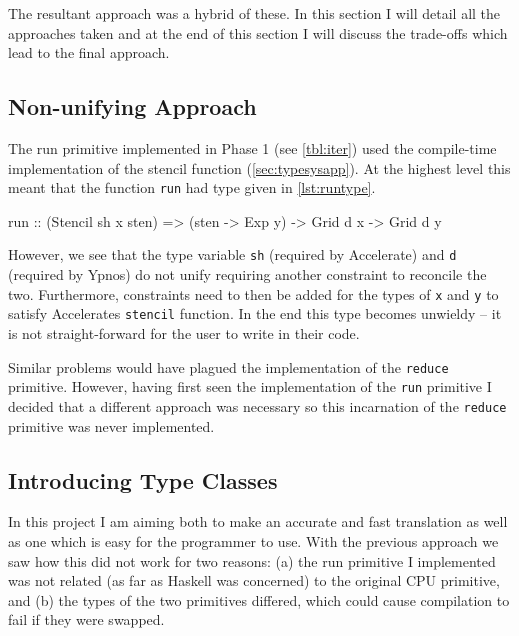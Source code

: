 \documentclass[
    12pt,
    a4paper,
    twoside,
    openright,
    ]{scrbook}
\begin{document}
The resultant approach was a hybrid of these. In this section I will detail all
the approaches taken and at the end of this section I will discuss the
trade-offs which lead to the final approach.

\subsection{Non-unifying Approach}
\label{sec:non-unify-appr}

The run primitive implemented in Phase 1 (see \autoref{tbl:iter}) used the
compile-time implementation of the stencil function
(\autoref{sec:typesysapp}). At the highest level this meant that the function
\texttt{run} had type given in \autoref{lst:runtype}.

\begin{hlisting}[label={lst:runtype}, caption=The type of run required by Accelerate.]
run :: (Stencil sh x sten) => (sten -> Exp y) -> Grid d x -> Grid d y
\end{hlisting}

However, we see that the type variable \texttt{sh} (required by Accelerate) and
\texttt{d} (required by Ypnos) do not unify requiring another constraint to
reconcile the two. Furthermore, constraints need to then be added for the types
of \texttt{x} and \texttt{y} to satisfy Accelerates \texttt{stencil}
function. In the end this type becomes unwieldy -- it is not straight-forward
for the user to write in their code.

Similar problems would have plagued the implementation of the \texttt{reduce}
primitive. However, having first seen the implementation of the \texttt{run}
primitive I decided that a different approach was necessary so this incarnation
of the \texttt{reduce} primitive was never implemented.

\subsection{Introducing Type Classes}
\label{sec:intr-type-class}

In this project I am aiming both to make an accurate and fast translation as
well as one which is easy for the programmer to use.  With the previous approach
we saw how this did not work for two reasons: (a) the run primitive I
implemented was not related (as far as Haskell was concerned) to the original
CPU primitive, and (b) the types of the two primitives differed, which could
cause compilation to fail if they were swapped.
\end{document}
